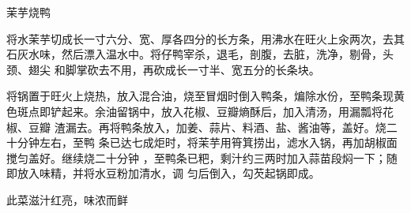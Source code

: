 \begin{recipe}{茉芋烧鸭}

\ingredients




\preparation

\step 将水茉芋切成长一寸六分、宽、厚各四分的长方条，用沸水在旺火上汆两次，去其
石灰水味，然后漂入温水中。将仔鸭宰杀，退毛，剖腹，去脏，洗净，剔骨，头颈、翅尖
和脚掌砍去不用，再砍成长一寸半、宽五分的长条块。

\step 将锅置于旺火上烧热，放入混合油，烧至冒烟时倒入鸭条，煸除水份，至鸭条现黄
色斑点即铲起来。余油留锅中，放入花椒、豆瓣熵酥后，加入清汤，用漏瓢将花椒、豆瓣
渣漏去。再将鸭条放入，加姜、蒜片、料酒、盐、酱油等，盖好。烧二十分钟左右，至鸭
条已达七成炬时，将茉芋用筲箕捞出，滤水入锅，再加胡椒面搅匀盖好。继续烧二十分钟
，至鸭条已粑，剩汁约三两时加入蒜苗段焖一下；随即放入味精，并将水豆粉加清水，调
匀后倒入，勾芡起锅即成。

\features

此菜滋汁红亮，味浓而鲜

\end{recipe}

